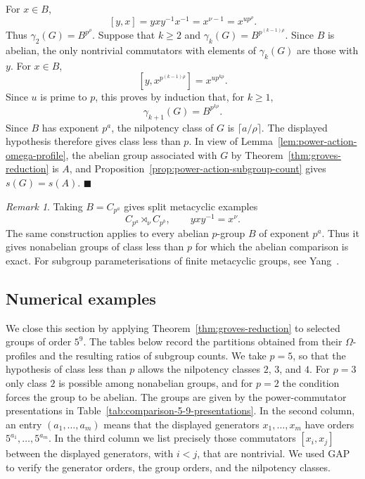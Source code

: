 \documentclass[a4paper,11pt,reqno]{amsart}
\theoremstyle{plain}
\theoremstyle{remark}
\newtheorem{remark}[theorem]{Remark}
\numberwithin{equation}{section}
\renewcommand{\geq}{\geqslant}
\newenvironment{proofof}{{\bf Proof. }}{\hfill $\blacksquare$ \\}
\begin{document}
\begin{proofof}
For $x\in B$,
\[
        [y,x]=yxy^{-1}x^{-1}=x^{\nu-1}=x^{up^\rho}.
\]
Thus $\gamma_2(G)=B^{p^\rho}$. Suppose that $k\geq 2$ and
$\gamma_k(G)=B^{p^{(k-1)\rho}}$. Since $B$ is abelian, the only nontrivial
commutators with elements of $\gamma_k(G)$ are those with $y$. For $x\in B$,
\[
        [y,x^{p^{(k-1)\rho}}]=x^{up^{k\rho}}.
\]
Since $u$ is prime to $p$, this proves by induction that, for $k\geq 1$,
\[
        \gamma_{k+1}(G)=B^{p^{k\rho}}.
\]
Since $B$ has exponent $p^a$, the nilpotency class of $G$ is
$\lceil a/\rho\rceil$. The displayed hypothesis therefore gives class less
than $p$. In view of Lemma~\ref{lem:power-action-omega-profile}, the abelian group
associated with $G$ by Theorem~\ref{thm:groves-reduction} is $A$, and
Proposition~\ref{prop:power-action-subgroup-count} gives $s(G)=s(A)$.
\end{proofof}

\begin{remark}
Taking $B=C_{p^a}$ gives split metacyclic examples
\[
        C_{p^a}\rtimes_\nu C_{p^b},
        \qquad
        yxy^{-1}=x^\nu.
\]
The same construction applies to every abelian $p$-group $B$ of exponent
$p^a$. Thus it gives nonabelian groups of class less than $p$ for which the
abelian comparison is exact. For subgroup parameterisations of finite metacyclic
groups, see Yang~\cite[Th.~3.2]{Yang2020}.
\end{remark}

\subsection{Numerical examples}

We close this section by applying Theorem~\ref{thm:groves-reduction} to selected groups of order $5^9$. 
The tables below record the partitions obtained from their $\Omega$-profiles and the resulting ratios of subgroup counts.
We take $p=5$, so that the hypothesis of class less than $p$ allows the
nilpotency classes $2$, $3$, and $4$. For $p=3$ only class $2$ is possible
among nonabelian groups, and for $p=2$ the condition forces the group to be
abelian.
The groups are given by the power-commutator presentations in
Table~\ref{tab:comparison-5-9-presentations}. In the second column, an entry
$(a_1,\ldots,a_m)$ means that the displayed generators $x_1,\ldots,x_m$ have
orders $5^{a_1},\ldots,5^{a_m}$. In the third column we list precisely those commutators $[x_i,x_j]$ between
the displayed generators, with $i<j$, that are nontrivial. We used GAP~\cite{GAP4} to verify the generator orders, the group orders, and the nilpotency classes.
\end{document}
